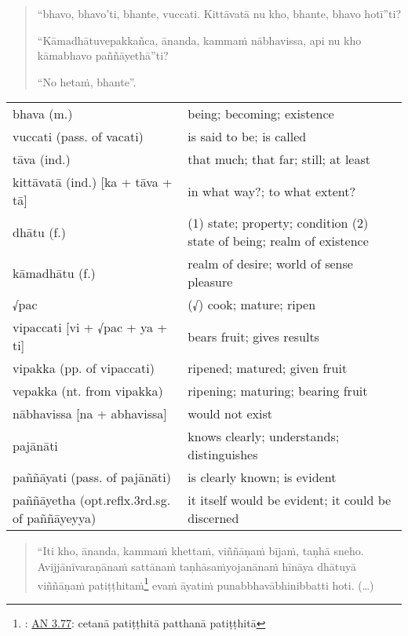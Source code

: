 \documentclass[11pt,oneside]{memoir}
\begin{document}
\begin{quote}
“bhavo, bhavo'ti, bhante, vuccati. Kittāvatā nu kho, bhante, bhavo hotī”ti?

“Kāmadhātuvepakkañca, ānanda, kammaṁ nābhavissa, api nu kho kāmabhavo paññāyethā”ti?

“No hetaṁ, bhante”.
\end{quote}

\begin{longtable}{L{\colOne} L{\colTwo}}
bhava (m.) & being; becoming; existence\\[0pt]
vuccati (pass. of vacati) & is said to be; is called\\[0pt]
tāva (ind.) & that much; that far; still; at least\\[0pt]
kittāvatā (ind.) [ka + tāva + tā] & in what way?; to what extent?\\[0pt]
dhātu (f.) & (1) state; property; condition (2) state of being; realm of existence\\[0pt]
kāmadhātu (f.) & realm of desire; world of sense pleasure\\[0pt]
√pac & (√) cook; mature; ripen\\[0pt]
vipaccati [vi + √pac + ya + ti] & bears fruit; gives results\\[0pt]
vipakka (pp. of vipaccati) & ripened; matured; given fruit\\[0pt]
vepakka (nt. from vipakka) & ripening; maturing; bearing fruit\\[0pt]
nābhavissa [na + abhavissa] & would not exist\\[0pt]
pajānāti & knows clearly; understands; distinguishes\\[0pt]
paññāyati (pass. of pajānāti) & is clearly known; is evident\\[0pt]
paññāyetha (opt.reflx.3rd.sg. of paññāyeyya) & it itself would be evident; it could be discerned\\[0pt]
\end{longtable}

\clearpage

\begin{quote}
“Iti kho, ānanda, kammaṁ khettaṁ, viññāṇaṁ bījaṁ, taṇhā sneho. Avijjānīvaraṇānaṁ
sattānaṁ taṇhāsaṁyojanānaṁ hīnāya dhātuyā viññāṇaṁ
patiṭṭhitaṁ\footnote{: \href{https://suttacentral.net/an3.77/en/sujato}{AN 3.77}: cetanā patiṭṭhitā patthanā patiṭṭhitā} evaṁ āyatiṁ punabbhavābhinibbatti hoti. (…)
\end{quote}
\end{document}
